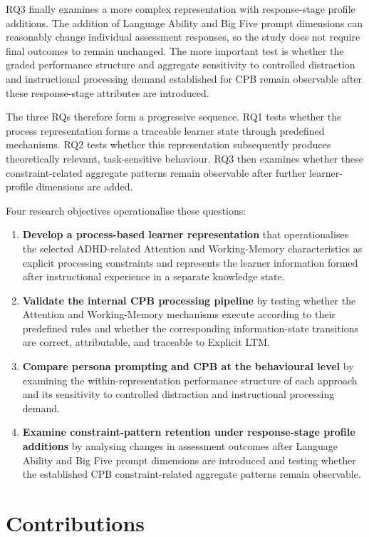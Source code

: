 RQ3 finally examines a more complex representation with response-stage profile additions. The addition of Language Ability and Big Five prompt dimensions can reasonably change individual assessment responses, so the study does not require final outcomes to remain unchanged. The more important test is whether the graded performance structure and aggregate sensitivity to controlled distraction and instructional processing demand established for CPB remain observable after these response-stage attributes are introduced.

The three RQs therefore form a progressive sequence. RQ1 tests whether the process representation forms a traceable learner state through predefined mechanisms. RQ2 tests whether this representation subsequently produces theoretically relevant, task-sensitive behaviour. RQ3 then examines whether these constraint-related aggregate patterns remain observable after further learner-profile dimensions are added.

Four research objectives operationalise these questions:

\begin{enumerate}
    \item \textbf{Develop a process-based learner representation} that operationalises the selected ADHD-related Attention and Working-Memory characteristics as explicit processing constraints and represents the learner information formed after instructional experience in a separate knowledge state.
    \item \textbf{Validate the internal CPB processing pipeline} by testing whether the Attention and Working-Memory mechanisms execute according to their predefined rules and whether the corresponding information-state transitions are correct, attributable, and traceable to Explicit LTM.
    \item \textbf{Compare persona prompting and CPB at the behavioural level} by examining the within-representation performance structure of each approach and its sensitivity to controlled distraction and instructional processing demand.
    \item \textbf{Examine constraint-pattern retention under response-stage profile additions} by analysing changes in assessment outcomes after Language Ability and Big Five prompt dimensions are introduced and testing whether the established CPB constraint-related aggregate patterns remain observable.
\end{enumerate}

\section{Contributions}

